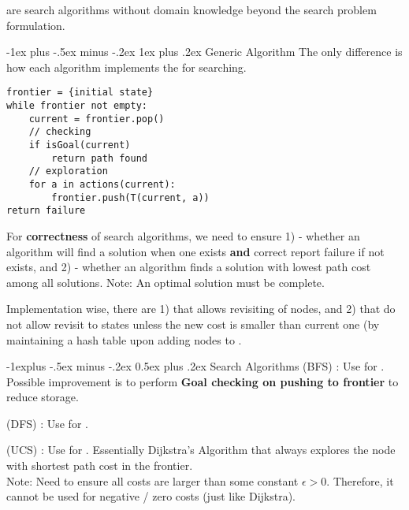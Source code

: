 \documentclass[10pt,landscape,letterpaper]{article}
\makeatletter
\renewcommand{\subsection}{\@startsection{subsection}{2}{0mm}%
                                {-1explus -.5ex minus -.2ex}%
                                {0.5ex plus .2ex}%
                                {\sffamily\normalsize\itshape}}
\renewcommand{\subsubsection}{\@startsection{subsubsection}{3}{0mm}%
                                {-1ex plus -.5ex minus -.2ex}%
                                {1ex plus .2ex}%
                                {\normalfont\small\itshape}}
\makeatother
\begin{document}
\begin{multicols}{3}
 are search algorithms without domain knowledge beyond the search problem formulation.


\subsubsection{Generic Algorithm}
The only difference is how each algorithm implements the  for searching. 

\begin{lstlisting}
frontier = {initial state}
while frontier not empty:
    current = frontier.pop()
	// checking
	if isGoal(current) 
		return path found
	// exploration
	for a in actions(current):
		frontier.push(T(current, a)) 
return failure
\end{lstlisting}

For \textbf{correctness} of search algorithms, we need to ensure 1)  - whether an algorithm will find a solution when one exists \textbf{and} correct report failure if not exists, and 2)  - whether an algorithm finds a solution with lowest path cost among all solutions.
Note: An optimal solution must be complete.
\smallskip

Implementation wise, there are 1)  that allows revisiting of nodes, and 2)  that do not allow revisit to states unless the new cost is smaller than current one (by maintaining a  hash table upon adding nodes to . 


\subsection{Search Algorithms}
 (BFS) : Use  for . Possible improvement is to perform \textbf{Goal checking on pushing to frontier} to reduce storage.

\smallskip

 (DFS) : Use  for .
\smallskip

 (UCS) : Use  for . Essentially Dijkstra's Algorithm that always explores the node with shortest path cost in the frontier.
\\
Note: Need to ensure all costs are larger than some constant $\epsilon > 0$. Therefore, it cannot be used for negative / zero costs (just like Dijkstra).
\smallskip


\end{multicols}
\end{document}
